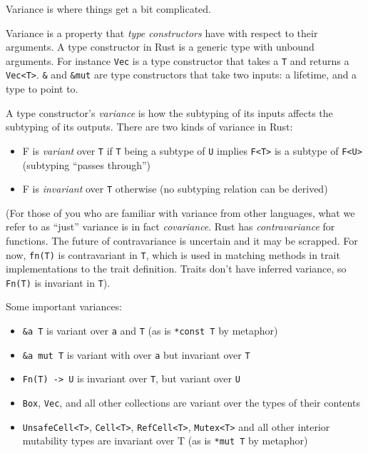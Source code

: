 \documentclass[a4paper,]{book}
\begin{document}
Variance is where things get a bit complicated.

Variance is a property that \emph{type constructors} have with respect
to their arguments. A type constructor in Rust is a generic type with
unbound arguments. For instance \texttt{Vec} is a type constructor that
takes a \texttt{T} and returns a \texttt{Vec\textless{}T\textgreater{}}.
\texttt{\&} and \texttt{\&mut} are type constructors that take two
inputs: a lifetime, and a type to point to.

A type constructor's \emph{variance} is how the subtyping of its inputs
affects the subtyping of its outputs. There are two kinds of variance in
Rust:

\begin{itemize}
\itemsep1pt\parskip0pt
\item
  F is \emph{variant} over \texttt{T} if \texttt{T} being a subtype of
  \texttt{U} implies \texttt{F\textless{}T\textgreater{}} is a subtype
  of \texttt{F\textless{}U\textgreater{}} (subtyping ``passes through'')
\item
  F is \emph{invariant} over \texttt{T} otherwise (no subtyping relation
  can be derived)
\end{itemize}

(For those of you who are familiar with variance from other languages,
what we refer to as ``just'' variance is in fact \emph{covariance}. Rust
has \emph{contravariance} for functions. The future of contravariance is
uncertain and it may be scrapped. For now, \texttt{fn(T)} is
contravariant in \texttt{T}, which is used in matching methods in trait
implementations to the trait definition. Traits don't have inferred
variance, so \texttt{Fn(T)} is invariant in \texttt{T}).

Some important variances:

\begin{itemize}
\itemsep1pt\parskip0pt
\item
  \texttt{\&\textquotesingle{}a\ T} is variant over
  \texttt{\textquotesingle{}a} and \texttt{T} (as is \texttt{*const\ T}
  by metaphor)
\item
  \texttt{\&\textquotesingle{}a\ mut\ T} is variant with over
  \texttt{\textquotesingle{}a} but invariant over \texttt{T}
\item
  \texttt{Fn(T)\ -\textgreater{}\ U} is invariant over \texttt{T}, but
  variant over \texttt{U}
\item
  \texttt{Box}, \texttt{Vec}, and all other collections are variant over
  the types of their contents
\item
  \texttt{UnsafeCell\textless{}T\textgreater{}},
  \texttt{Cell\textless{}T\textgreater{}},
  \texttt{RefCell\textless{}T\textgreater{}},
  \texttt{Mutex\textless{}T\textgreater{}} and all other interior
  mutability types are invariant over T (as is \texttt{*mut\ T} by
  metaphor)
\end{itemize}
\end{document}
